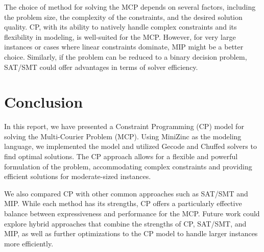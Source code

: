 \documentclass{article}
\begin{document}
The choice of method for solving the MCP depends on several factors, including the problem size, the complexity of the constraints, and the desired solution quality. CP, with its ability to natively handle complex constraints and its flexibility in modeling, is well-suited for the MCP. However, for very large instances or cases where linear constraints dominate, MIP might be a better choice. Similarly, if the problem can be reduced to a binary decision problem, SAT/SMT could offer advantages in terms of solver efficiency.

\section{Conclusion}

In this report, we have presented a Constraint Programming (CP) model for solving the Multi-Courier Problem (MCP). Using MiniZinc as the modeling language, we implemented the model and utilized Gecode and Chuffed solvers to find optimal solutions. The CP approach allows for a flexible and powerful formulation of the problem, accommodating complex constraints and providing efficient solutions for moderate-sized instances.

We also compared CP with other common approaches such as SAT/SMT and MIP. While each method has its strengths, CP offers a particularly effective balance between expressiveness and performance for the MCP. Future work could explore hybrid approaches that combine the strengths of CP, SAT/SMT, and MIP, as well as further optimizations to the CP model to handle larger instances more efficiently.
\end{document}
